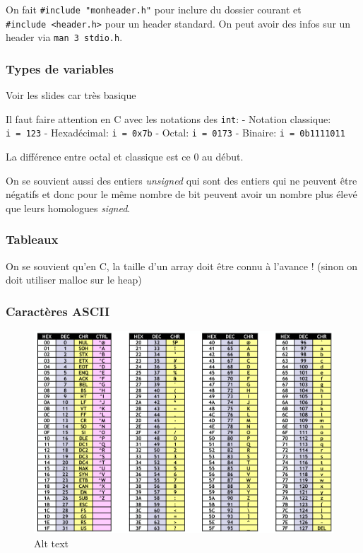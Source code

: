 On fait \texttt{\#include\ "monheader.h"} pour inclure du dossier
courant et \texttt{\#include\ \textless{}header.h\textgreater{}} pour un
header standard. On peut avoir des infos sur un header via
\texttt{man\ 3\ stdio.h}.

\subsubsection{Types de variables}\label{types-de-variables}

Voir les slides car très basique

Il faut faire attention en C avec les notations des \texttt{int}: -
Notation classique: \texttt{i\ =\ 123} - Hexadécimal:
\texttt{i\ =\ 0x7b} - Octal: \texttt{i\ =\ 0173} - Binaire:
\texttt{i\ =\ 0b1111011}

La différence entre octal et classique est ce 0 au début.

On se souvient aussi des entiers \emph{unsigned} qui sont des entiers
qui ne peuvent être négatifs et donc pour le même nombre de bit peuvent
avoir un nombre plus élevé que leurs homologues \emph{signed}.

\subsubsection{Tableaux}\label{tableaux}

On se souvient qu'en C, la taille d'un array doit être connu à l'avance
! (sinon on doit utiliser malloc sur le heap)

\subsubsection{Caractères ASCII}\label{caractuxe8res-ascii}

\begin{figure}
\centering
\includegraphics{image-6.png}
\caption{Alt text}
\end{figure}


